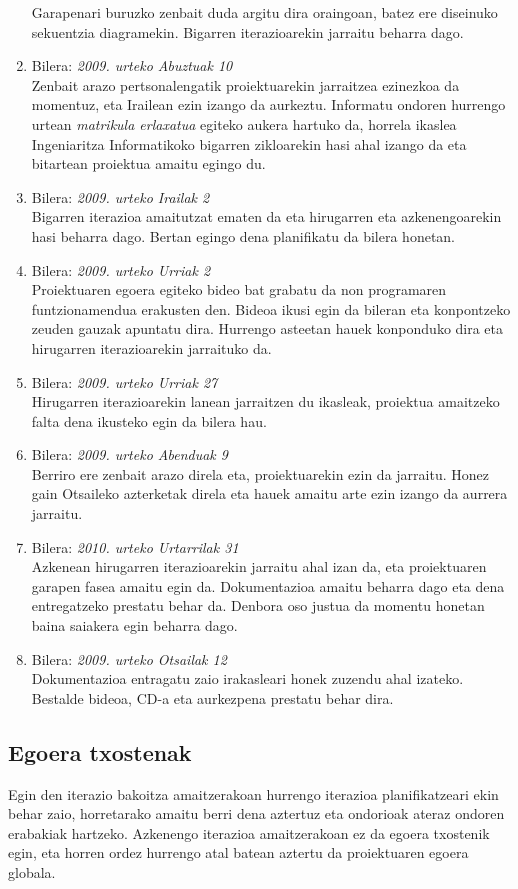 \begin{enumerate}
		Garapenari buruzko zenbait duda argitu dira oraingoan, batez ere diseinuko sekuentzia diagramekin. Bigarren iterazioarekin jarraitu beharra dago.
	\item Bilera: \textit{2009. urteko Abuztuak 10}\\
		Zenbait arazo pertsonalengatik proiektuarekin jarraitzea ezinezkoa da momentuz, eta Irailean ezin izango da aurkeztu. Informatu ondoren hurrengo urtean \textit{matrikula erlaxatua} egiteko aukera hartuko da, horrela ikaslea Ingeniaritza Informatikoko bigarren zikloarekin hasi ahal izango da eta bitartean proiektua amaitu egingo du.
	\item Bilera: \textit{2009. urteko Irailak 2}\\
		Bigarren iterazioa amaitutzat ematen da eta hirugarren eta azkenengoarekin hasi beharra dago. Bertan egingo dena planifikatu da bilera honetan.
	\item Bilera: \textit{2009. urteko Urriak 2}\\
		Proiektuaren egoera egiteko bideo bat grabatu da non programaren funtzionamendua erakusten den. Bideoa ikusi egin da bileran eta konpontzeko zeuden gauzak apuntatu dira. Hurrengo asteetan hauek konponduko dira eta hirugarren iterazioarekin jarraituko da.
	\item Bilera: \textit{2009. urteko Urriak 27}\\
		Hirugarren iterazioarekin lanean jarraitzen du ikasleak, proiektua amaitzeko falta dena ikusteko egin da bilera hau.
	\item Bilera: \textit{2009. urteko Abenduak 9}\\
		Berriro ere zenbait arazo direla eta, proiektuarekin ezin da jarraitu. Honez gain Otsaileko azterketak direla eta hauek amaitu arte ezin izango da aurrera jarraitu.
	\item Bilera: \textit{2010. urteko Urtarrilak 31}\\
		Azkenean hirugarren iterazioarekin jarraitu ahal izan da, eta proiektuaren garapen fasea amaitu egin da. Dokumentazioa amaitu beharra dago eta dena entregatzeko prestatu behar da. Denbora oso justua da momentu honetan baina saiakera egin beharra dago.
	\item Bilera: \textit{2009. urteko Otsailak 12}\\ Dokumentazioa entragatu zaio irakasleari honek zuzendu ahal izateko. Bestalde bideoa, CD-a  eta aurkezpena prestatu behar dira.
\end{enumerate}

\subsection{Egoera txostenak}
Egin den iterazio bakoitza amaitzerakoan hurrengo iterazioa planifikatzeari ekin behar zaio, horretarako amaitu berri dena aztertuz eta ondorioak ateraz ondoren erabakiak hartzeko. Azkenengo iterazioa amaitzerakoan ez da egoera txostenik egin, eta horren ordez hurrengo atal batean aztertu da proiektuaren egoera globala.

